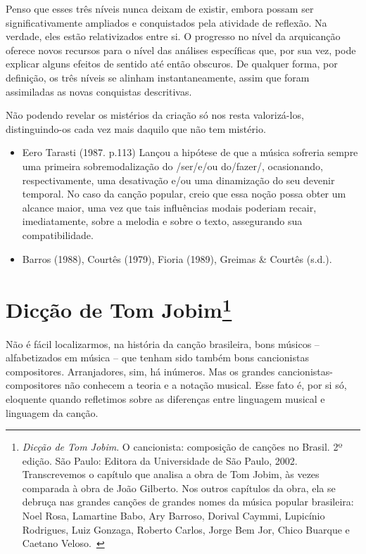 Penso que esses três níveis nunca deixam de existir, embora possam ser
significativamente ampliados e conquistados pela atividade de reflexão.
Na verdade, eles estão relativizados entre si. O progresso no nível da
arquicanção oferece novos recursos para o nível das análises específicas
que, por sua vez, pode explicar alguns efeitos de sentido até então
obscuros. De qualquer forma, por definição, os três níveis se alinham
instantaneamente, assim que foram assimiladas as novas conquistas
descritivas.

Não podendo revelar os mistérios da criação só nos resta valorizá-los,
distinguindo-os cada vez mais daquilo que não tem mistério.~

\begin{itemize}
\item
  Eero Tarasti (1987. p.113) Lançou a hipótese de que a música sofreria
  sempre uma primeira sobremodalização do /ser/e/ou do/fazer/,
  ocasionando, respectivamente, uma desativação e/ou uma dinamização do
  seu devenir temporal. No caso da canção popular, creio que essa noção
  possa obter um alcance maior, uma vez que tais influências modais
  poderiam recair, imediatamente, sobre a melodia e sobre o texto,
  assegurando sua compatibilidade.

\item
  Barros (1988), Courtês (1979), Fioria (1989), Greimas \& Courtês (s.d.).
\end{itemize}

\chapter{Dicção de Tom Jobim\footnote{\emph{Dicção de Tom Jobim}. O cancionista: composição de canções no
Brasil. 2º edição. São Paulo: Editora da Universidade de São Paulo,
2002.\\
Transcrevemos o capítulo que analisa a obra de Tom Jobim,
às vezes comparada à obra de João Gilberto. Nos outros capítulos da
obra, ela se debruça nas grandes canções de grandes nomes da música
popular brasileira: Noel Rosa, Lamartine Babo, Ary Barroso, Dorival
Caymmi, Lupicínio Rodrigues, Luiz Gonzaga, Roberto Carlos, Jorge Bem
Jor, Chico Buarque e Caetano Veloso.~}}



Não é fácil localizarmos, na história da canção brasileira, bons músicos
-- alfabetizados em música -- que tenham sido também bons cancionistas
compositores. Arranjadores, sim, há inúmeros. Mas os grandes
cancionistas-compositores não conhecem a teoria e a notação musical.
Esse fato é, por si só, eloquente quando refletimos sobre as diferenças
entre linguagem musical e linguagem da canção.

